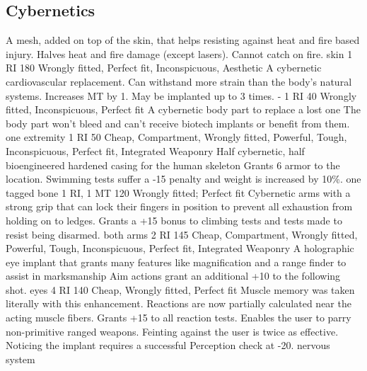 \subsection{Cybernetics}
\vspace{10mm}
\begin{multicols}{2}
    {A mesh, added on top of the skin, that helps resisting against heat and fire based injury.}
    {Halves heat and fire damage (except lasers). Cannot catch on fire.}
    {skin}
    {1 RI}
    {180}
    {Wrongly fitted, Perfect fit, Inconspicuous, Aesthetic}
    {A cybernetic cardiovascular replacement. Can withstand more strain than the body's natural systems.}
    {Increases MT by 1. May be implanted up to 3 times.}
    {-}
    {1 RI}
    {40}
    {Wrongly fitted, Inconspicuous, Perfect fit}
    {A cybernetic body part to replace a lost one}
    {The body part won't bleed and can't receive biotech implants or benefit from them.}
    {one extremity}
    {1 RI}
    {50}
    {Cheap, Compartment, Wrongly fitted, Powerful, Tough, Inconspicuous, Perfect fit, Integrated Weaponry}
    {Half cybernetic, half bioengineered hardened casing for the human skeleton}
    {Grants 6 armor to the location. Swimming tests suffer a -15 penalty and weight is increased by 10\%.}
    {one tagged bone}
    {1 RI, 1 MT}
    {120}
    {Wrongly fitted; Perfect fit}
    {Cybernetic arms with a strong grip that can lock their fingers in position to prevent all exhaustion from holding on to ledges.}
    {Grants a +15 bonus to climbing tests and tests made to resist being disarmed.}
    {both arms}
    {2 RI}
    {145}
    {Cheap, Compartment, Wrongly fitted, Powerful, Tough, Inconspicuous, Perfect fit, Integrated Weaponry}
    {A holographic eye implant that grants many features like magnification and a range finder to assist in marksmanship}
    {Aim actions grant an additional +10 to the following shot.}
    {eyes}
    {4 RI}
    {140}
    {Cheap, Wrongly fitted, Perfect fit}
    {Muscle memory was taken literally with this enhancement. Reactions are now partially calculated near the acting muscle fibers.}
    {Grants +15 to all reaction tests. Enables the user to parry non-primitive ranged weapons.
	   Feinting against the user is twice as effective.
       Noticing the implant requires a successful Perception check at -20.}
    {nervous system}

\end{multicols}
